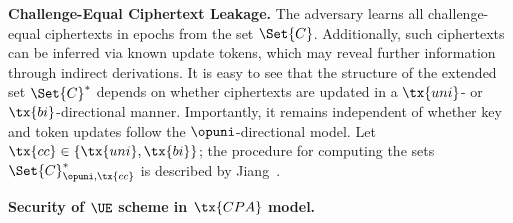 \documentclass{fundam}
\begin{document}
\vspace{0.3cm}
\noindent\textbf{Challenge-Equal Ciphertext Leakage.} The adversary learns all challenge-equal ciphertexts in epochs from the set $\Set{C}$. Additionally, such ciphertexts can be inferred via known update tokens, which may reveal further information through indirect derivations.
It is easy to see that the structure of the extended set $\Set{C}^{*}$ depends on whether ciphertexts are updated in a $\tx{uni}$- or $\tx{bi}$-directional manner. Importantly, it remains independent of whether key and token updates follow the $\opuni$-directional model. Let $\tx{cc} \in \{\tx{uni}, \tx{bi}\}$; the procedure for computing the sets $\Set{C}_{\opuni, \tx{cc}}^{*}$ is described by Jiang~\cite{jiang2020}.


\vspace{0.3cm}
\noindent\textbf{Security of $\UE$ scheme in $\tx{CPA}$ model.}

\vspace{0.5cm}
\begin{pchstack}[center]
	
	\pchspace
	
	\hspace{2cm}
	
	\pchspace
\end{pchstack}

\vspace{0.5cm}
\end{document}
